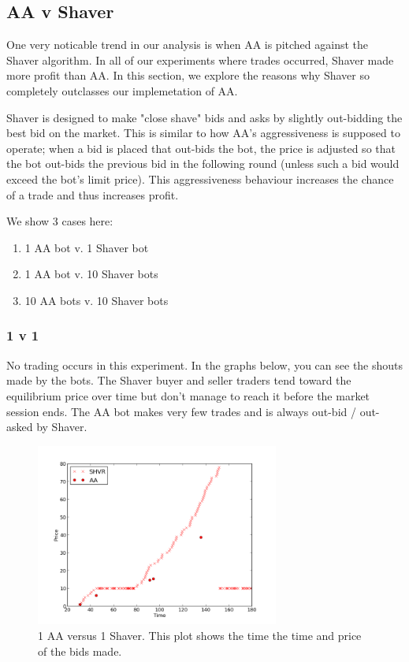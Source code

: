 \documentclass{acm_proc_article-sp}
\begin{document}
\subsection{AA v Shaver} One very noticable trend in our analysis is when AA
is pitched against the Shaver algorithm. In all of our experiments where trades
occurred, Shaver made more profit than AA. In this section, we explore the
reasons why Shaver so completely outclasses our implemetation of AA.

Shaver is designed to make "close shave" bids and asks by slightly out-bidding
the best bid on the market. This is similar to how AA's aggressiveness is
supposed to operate; when a bid is placed that out-bids the bot, the price is
adjusted so that the bot out-bids the previous bid in the following round
(unless such a bid would exceed the bot's limit price). This aggressiveness
behaviour increases the chance of a trade and thus increases profit.

We show 3 cases here:
\begin{enumerate}
\item 1 AA bot v. 1 Shaver bot
\item 1 AA bot v. 10 Shaver bots
\item 10 AA bots v. 10 Shaver bots
\end{enumerate}

\subsubsection{1 v 1} No trading occurs in this experiment. In the graphs
below, you can see the shouts made by the bots. The Shaver buyer and seller
traders tend toward the equilibrium price over time but don't manage to reach
it before the market session ends. The AA bot makes very few trades and is
always out-bid / out-asked by Shaver.

\begin{figure}[h!] \includegraphics[width=80mm]{SHVR1AA1_180_all_bids.png}
\caption {1 AA versus 1 Shaver. This plot shows the time the time and price of the bids made.}
\end{figure}
\end{document}
